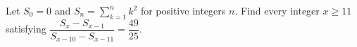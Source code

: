 Let $S_0=0$ and $S_n=\sum_{k=1}^n k^2$ for positive integers $n$. Find every integer $x\ge11$ satisfying $\dfrac{S_x-S_{x-1}}{S_{x-10}-S_{x-11}}=\dfrac{49}{25}$.
